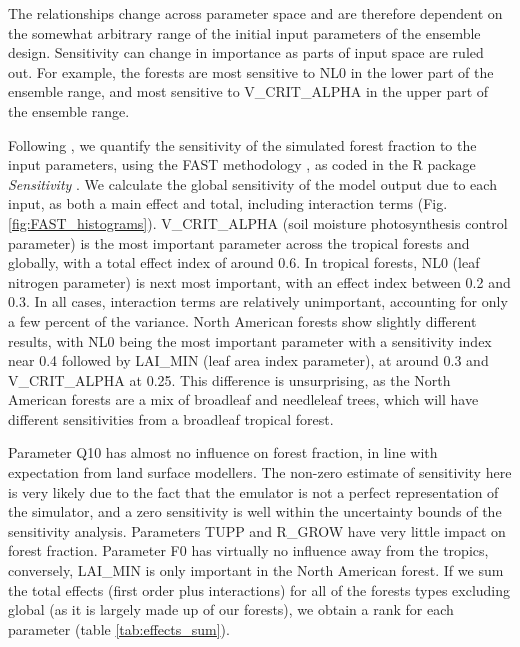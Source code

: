 \documentclass[esd, article]{copernicus} %
\begin{document}
The relationships change across parameter space and are therefore dependent on the somewhat arbitrary range of the initial input parameters of the ensemble design. Sensitivity can change in importance as parts of input space are ruled out. For example, the forests are most sensitive to NL0 in the lower part of the ensemble range, and most sensitive to V\_CRIT\_ALPHA in the upper part of the ensemble range.


Following \citep{carslaw2013large}, we quantify the sensitivity of the simulated forest fraction to the input parameters, using the FAST methodology \citep{saltelli1999sensitivity}, as coded in the R package \emph{Sensitivity} \citep{Rpackage2015sensitivity}. We calculate the global sensitivity of the model output due to each input, as both a main effect and total, including interaction terms (Fig.  \ref{fig:FAST_histograms}). V\_CRIT\_ALPHA (soil moisture photosynthesis control parameter) is the most important parameter across the tropical forests and globally, with a total effect index of around 0.6. In tropical forests, NL0 (leaf nitrogen parameter) is next most important, with an effect index between 0.2 and 0.3. In all cases, interaction terms are relatively unimportant, accounting for only a few percent of the variance. North American forests show slightly different results, with NL0 being the most important parameter with a sensitivity index near 0.4 followed by LAI\_MIN (leaf area index parameter), at around 0.3 and V\_CRIT\_ALPHA at 0.25. This difference is unsurprising, as the North American forests are a mix of broadleaf and needleleaf trees, which will have different sensitivities from a broadleaf tropical forest.


Parameter Q10 has almost no influence on forest fraction, in line with expectation from land surface modellers. The non-zero estimate of sensitivity here is very likely due to the fact that the emulator is not a perfect representation of the simulator, and a zero sensitivity is well within the uncertainty bounds of the sensitivity analysis. Parameters TUPP and R\_GROW have very little impact on forest fraction. Parameter F0 has virtually no influence away from the tropics, conversely, LAI\_MIN is only important in the North American forest. If we sum the total effects (first order plus interactions) for all of the forests types excluding global (as it is largely made up of our forests), we obtain a rank for each parameter (table \ref{tab:effects_sum}).
\end{document}
